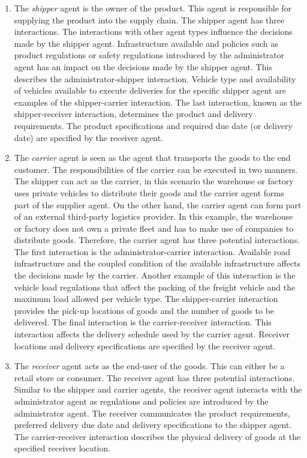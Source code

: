 \begin{enumerate}
    \item The \textit{shipper} agent is the owner of the product. This agent is responsible for supplying the product into the supply chain. The shipper agent has three interactions. The interactions with other agent types influence the decisions made by the shipper agent. Infrastructure available and policies such as product regulations or safety regulations introduced by the administrator agent has an impact on the decisions made by the shipper agent. This describes the administrator-shipper interaction. Vehicle type and availability of vehicles available to execute deliveries for the specific shipper agent are examples of the shipper-carrier interaction. The last interaction, known as the shipper-receiver interaction, determines the product and delivery requirements. The product specifications and required due date (or delivery date) are specified by the receiver agent.
    
    \item The \textit{carrier} agent is seen as the agent that transports the goods to the end customer. The responsibilities of the carrier can be executed in two manners. The shipper can act as the carrier, in this scenario the warehouse or factory uses private vehicles to distribute their goods and the carrier agent forms part of the supplier agent. On the other hand, the carrier agent can form part of an external third-party logistics provider. In this example, the warehouse or factory does not own a private fleet and has to make use of companies to distribute goods. Therefore, the carrier agent has three potential interactions. The first interaction is the administrator-carrier interaction. Available road infrastructure and the coupled condition of the available infrastructure affects the decisions made by the carrier. Another example of this interaction is the vehicle load regulations that affect the packing of the freight vehicle and the maximum load allowed per vehicle type. The shipper-carrier interaction provides the pick-up locations of goods and the number of goods to be delivered. The final interaction is the carrier-receiver interaction. This interaction affects the delivery schedule used by the carrier agent. Receiver locations and delivery specifications are specified by the receiver agent.
    
    \item The \textit{receiver} agent acts as the end-user of the goods. This can either be a retail store or consumer. The receiver agent has three potential interactions. Similar to the shipper and carrier agents, the receiver agent interacts with the administrator agent as regulations and policies are introduced by the administrator agent. The receiver communicates the product requirements, preferred delivery due date and delivery specifications to the shipper agent. The carrier-receiver interaction describes the physical delivery of goods at the specified receiver location.
    

\end{enumerate}
